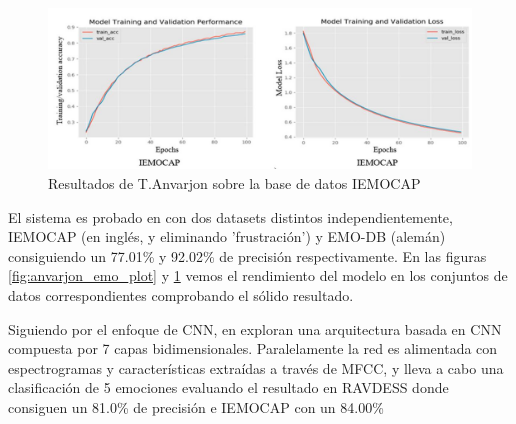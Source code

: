 \documentclass[11pt,a4paper,spanish]{book}
\begin{document}
	\begin{figure}[H]
		\centering
		\includegraphics[scale=0.35]{anvarjon2020_imeocap.JPG} 
		\caption{Resultados de T.Anvarjon sobre la base de datos IEMOCAP}
		\label{fig:anvarjon_ime_plot}
	\end{figure}

	El sistema es probado en con dos datasets distintos independientemente, IEMOCAP (en inglés, y eliminando 'frustración') y EMO-DB (alemán) consiguiendo un 77.01\% y 92.02\%  de precisión respectivamente. En las figuras \ref{fig:anvarjon_emo_plot} y \ref{fig:anvarjon_ime_plot} vemos el rendimiento del modelo en los conjuntos de datos correspondientes comprobando el sólido resultado.
	
	

	
	 Siguiendo por el enfoque de CNN, en \cite{Mustaqeem2020} exploran una arquitectura basada en CNN compuesta por 7 capas bidimensionales. Paralelamente la red es alimentada con espectrogramas y características extraídas a través de MFCC, y lleva a cabo una clasificación de 5 emociones evaluando el resultado en RAVDESS donde consiguen un 81.0\% de precisión e IEMOCAP con un 84.00\%
	 
\end{document}
